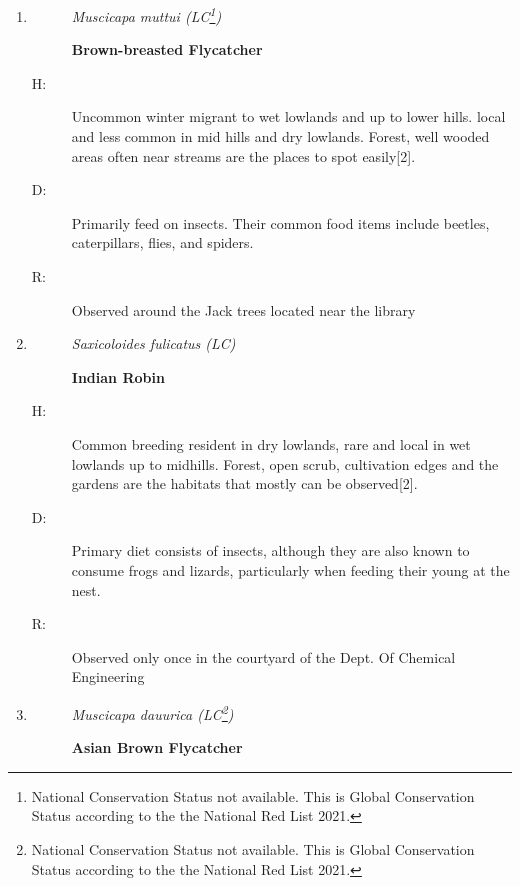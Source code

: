 \begin{itemize}
\begin{enumerate}
\begin{description}
\end{description}%
\item%
\begin{description}%
\item[]%
\textit{Muscicapa muttui (LC\footnote{National Conservation Status not available. This is Global Conservation Status according to the the National Red List 2021.})}%
\item[]%
\textbf{Brown{-}breasted Flycatcher}%
\end{description}%
\begin{description}%
\item[H: ]%
Uncommon winter migrant to wet lowlands and up to lower hills. local and less common in mid hills and dry lowlands. Forest, well wooded areas often near streams are the places to spot easily{[}2{]}.%
\item[D: ]%
Primarily feed on insects. Their common food items include beetles, caterpillars, flies, and spiders.%
\item[R: ]%
Observed around the Jack trees located near the library%
\end{description}%
\item%
\begin{description}%
\item[]%
\textit{Saxicoloides fulicatus (LC)}%
\item[]%
\textbf{Indian Robin}%
\end{description}%
\begin{description}%
\item[H: ]%
Common breeding resident in dry lowlands, rare and local in wet lowlands up to midhills. Forest, open scrub, cultivation edges and the gardens are the habitats that mostly can be observed{[}2{]}.%
\item[D: ]%
Primary diet consists of insects, although they are also known to consume frogs and lizards, particularly when feeding their young at the nest.%
\item[R: ]%
Observed only once in the courtyard of the Dept. Of Chemical Engineering%
\end{description}%
\item%
\begin{description}%
\item[]%
\textit{Muscicapa dauurica (LC\footnote{National Conservation Status not available. This is Global Conservation Status according to the the National Red List 2021.})}%
\item[]%
\textbf{Asian Brown Flycatcher}%
\end{description}%

\end{enumerate}
\end{itemize}
